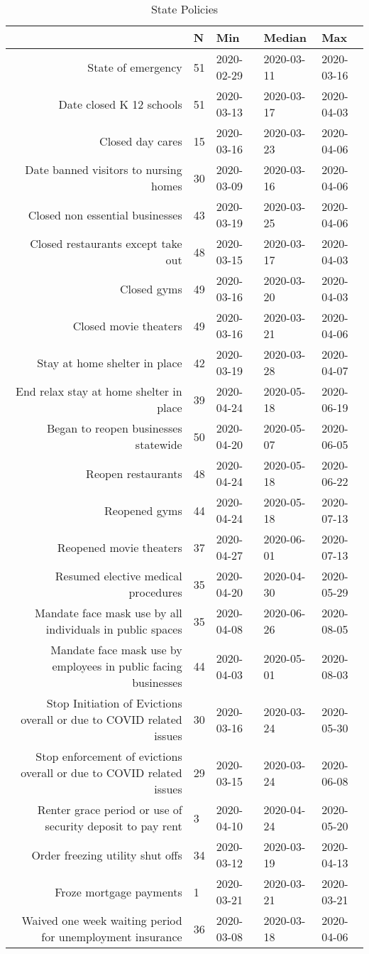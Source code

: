 \begin{table}[ht]
\centering
\begin{tabular}{rllll}
  \hline
 & N & Min & Median & Max \\ 
  \hline
State of emergency & 51 & 2020-02-29 & 2020-03-11 & 2020-03-16 \\ 
  Date closed K 12 schools & 51 & 2020-03-13 & 2020-03-17 & 2020-04-03 \\ 
  Closed day cares & 15 & 2020-03-16 & 2020-03-23 & 2020-04-06 \\ 
  Date banned visitors to nursing homes & 30 & 2020-03-09 & 2020-03-16 & 2020-04-06 \\ 
  Closed non essential businesses & 43 & 2020-03-19 & 2020-03-25 & 2020-04-06 \\ 
  Closed restaurants except take out & 48 & 2020-03-15 & 2020-03-17 & 2020-04-03 \\ 
  Closed gyms & 49 & 2020-03-16 & 2020-03-20 & 2020-04-03 \\ 
  Closed movie theaters & 49 & 2020-03-16 & 2020-03-21 & 2020-04-06 \\ 
  Stay at home  shelter in place & 42 & 2020-03-19 & 2020-03-28 & 2020-04-07 \\ 
  End relax stay at home shelter in place & 39 & 2020-04-24 & 2020-05-18 & 2020-06-19 \\ 
  Began to reopen businesses statewide & 50 & 2020-04-20 & 2020-05-07 & 2020-06-05 \\ 
  Reopen restaurants & 48 & 2020-04-24 & 2020-05-18 & 2020-06-22 \\ 
  Reopened gyms & 44 & 2020-04-24 & 2020-05-18 & 2020-07-13 \\ 
  Reopened movie theaters & 37 & 2020-04-27 & 2020-06-01 & 2020-07-13 \\ 
  Resumed elective medical procedures & 35 & 2020-04-20 & 2020-04-30 & 2020-05-29 \\ 
  Mandate face mask use by all individuals in public spaces & 35 & 2020-04-08 & 2020-06-26 & 2020-08-05 \\ 
  Mandate face mask use by employees in public facing businesses & 44 & 2020-04-03 & 2020-05-01 & 2020-08-03 \\ 
  Stop Initiation of Evictions overall or due to COVID related issues & 30 & 2020-03-16 & 2020-03-24 & 2020-05-30 \\ 
  Stop enforcement of evictions overall or due to COVID related issues & 29 & 2020-03-15 & 2020-03-24 & 2020-06-08 \\ 
  Renter grace period or use of security deposit to pay rent & 3 & 2020-04-10 & 2020-04-24 & 2020-05-20 \\ 
  Order freezing utility shut offs & 34 & 2020-03-12 & 2020-03-19 & 2020-04-13 \\ 
  Froze mortgage payments & 1 & 2020-03-21 & 2020-03-21 & 2020-03-21 \\ 
  Waived one week waiting period for unemployment insurance & 36 & 2020-03-08 & 2020-03-18 & 2020-04-06 \\ 
   \hline
\end{tabular}
\caption{State Policies \label{tab:policies}} 
\end{table}
